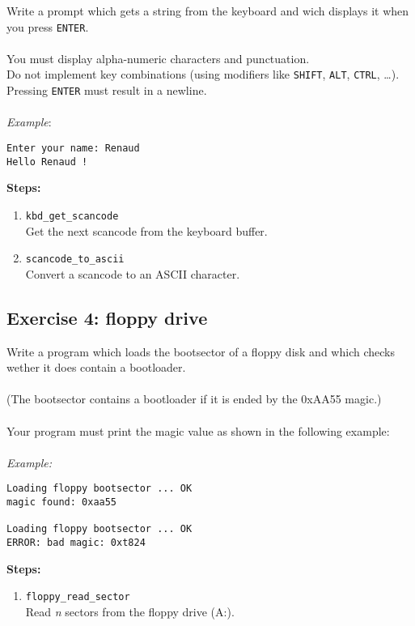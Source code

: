 Write a prompt which gets a string from the keyboard and wich displays it when you press {\tt ENTER}.\\
\\
You must display alpha-numeric characters and punctuation.\\
Do not implement key combinations (using modifiers like {\tt SHIFT}, {\tt ALT}, {\tt CTRL}, \ldots).\\
Pressing {\tt ENTER} must result in a newline.\\
\\
{\em Example}:
\begin{verbatim}
Enter your name: Renaud
Hello Renaud !
\end{verbatim}
{\bf Steps:}
  \begin{enumerate}
  \item {\tt kbd\_get\_scancode}\\
  Get the next scancode from the keyboard buffer.
  \item {\tt scancode\_to\_ascii}\\
  Convert a scancode to an ASCII character.
  \end{enumerate}



\subsection*{Exercise 4: floppy drive}

Write a program which loads the bootsector of a floppy disk and which checks wether it does contain a bootloader.\\
\\
(The bootsector contains a bootloader if it is ended by the 0xAA55 magic.)\\
\\
Your program must print the magic value as shown in the following example:\\
\\
{\em Example:}
\begin{verbatim}
Loading floppy bootsector ... OK
magic found: 0xaa55

Loading floppy bootsector ... OK
ERROR: bad magic: 0xt824
\end{verbatim}
{\bf Steps:}
  \begin{enumerate}
  \item {\tt floppy\_read\_sector}\\
  Read {\em n} sectors from the floppy drive (A:).
  \end{enumerate}

